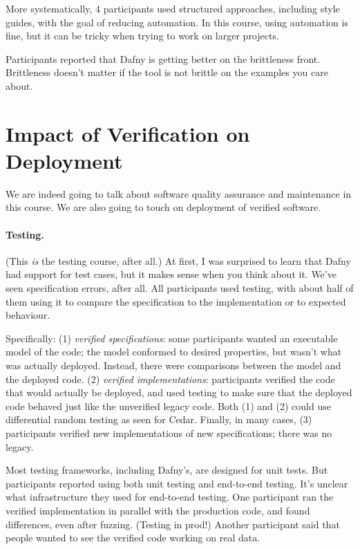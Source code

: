\documentclass[11pt]{article}
\begin{document}
More systematically, 4 participants used structured approaches, including style guides, with the
goal of reducing automation. In this course, using automation is fine, but it can be tricky when trying
to work on larger projects.

Participants reported that Dafny is getting better on the brittleness front. Brittleness doesn't matter
if the tool is not brittle on the examples you care about.

\section*{Impact of Verification on Deployment}
We are indeed going to talk about software quality assurance and
maintenance in this course. We are also going to touch on deployment
of verified software.

\paragraph{Testing.} (This \emph{is} the testing course, after all.) At first, I was surprised to learn
that Dafny had support for test cases, but it makes sense when you think about it. We've seen specification errors, after all. All participants used testing, with about half of them using it to compare the specification to the implementation or to expected behaviour.

Specifically: (1) \emph{verified specifications}: some participants wanted an executable model of the code; the model conformed to desired properties, but wasn't what was actually deployed. Instead, there were comparisons between the model and the deployed code. (2) \emph{verified implementations}: participants verified the code that would actually be deployed, and used testing to make sure that the deployed code behaved just like the unverified legacy code. Both (1) and (2) could use differential random testing as seen for Cedar. Finally, in many cases, (3) participants verified new implementations of new specifications; there was no legacy.

Most testing frameworks, including Dafny's, are designed for unit
tests.  But participants reported using both unit testing and
end-to-end testing. It's unclear what infrastructure they used for
end-to-end testing. One participant ran the verified implementation in
parallel with the production code, and found differences, even after
fuzzing. (Testing in prod!)  Another participant said that people
wanted to see the verified code working on real data.
\end{document}
